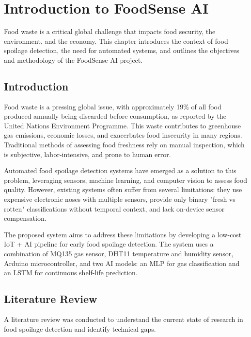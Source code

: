 \chapter{Introduction to FoodSense AI}
Food waste is a critical global challenge that impacts food security, the environment, and the economy. This chapter introduces the context of food spoilage detection, the need for automated systems, and outlines the objectives and methodology of the FoodSense AI project.

\section[Introduction]{\textbf{Introduction}}
Food waste is a pressing global issue, with approximately 19\% of all food produced annually being discarded before consumption, as reported by the United Nations Environment Programme. This waste contributes to greenhouse gas emissions, economic losses, and exacerbates food insecurity in many regions. Traditional methods of assessing food freshness rely on manual inspection, which is subjective, labor-intensive, and prone to human error.

Automated food spoilage detection systems have emerged as a solution to this problem, leveraging sensors, machine learning, and computer vision to assess food quality. However, existing systems often suffer from several limitations: they use expensive electronic noses with multiple sensors, provide only binary "fresh vs rotten" classifications without temporal context, and lack on-device sensor compensation.

The proposed system aims to address these limitations by developing a low-cost IoT + AI pipeline for early food spoilage detection. The system uses a combination of MQ135 gas sensor, DHT11 temperature and humidity sensor, Arduino microcontroller, and two AI models: an MLP for gas classification and an LSTM for continuous shelf-life prediction.

\section[Literature Review]{\textbf{Literature Review}}
A literature review was conducted to understand the current state of research in food spoilage detection and identify technical gaps.

